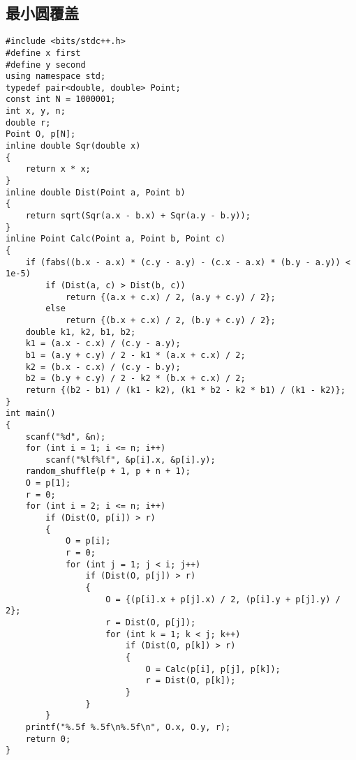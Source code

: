 \documentclass[a4paper]{article}
\begin{document}
\subsection{最小圆覆盖}
\begin{lstlisting}
#include <bits/stdc++.h>
#define x first
#define y second
using namespace std;
typedef pair<double, double> Point;
const int N = 1000001;
int x, y, n;
double r;
Point O, p[N];
inline double Sqr(double x)
{
    return x * x;
}
inline double Dist(Point a, Point b)
{
    return sqrt(Sqr(a.x - b.x) + Sqr(a.y - b.y));
}
inline Point Calc(Point a, Point b, Point c)
{
    if (fabs((b.x - a.x) * (c.y - a.y) - (c.x - a.x) * (b.y - a.y)) < 1e-5)
        if (Dist(a, c) > Dist(b, c))
            return {(a.x + c.x) / 2, (a.y + c.y) / 2};
        else
            return {(b.x + c.x) / 2, (b.y + c.y) / 2};
    double k1, k2, b1, b2;
    k1 = (a.x - c.x) / (c.y - a.y);
    b1 = (a.y + c.y) / 2 - k1 * (a.x + c.x) / 2;
    k2 = (b.x - c.x) / (c.y - b.y);
    b2 = (b.y + c.y) / 2 - k2 * (b.x + c.x) / 2;
    return {(b2 - b1) / (k1 - k2), (k1 * b2 - k2 * b1) / (k1 - k2)};
}
int main()
{
    scanf("%d", &n);
    for (int i = 1; i <= n; i++)
        scanf("%lf%lf", &p[i].x, &p[i].y);
    random_shuffle(p + 1, p + n + 1);
    O = p[1];
    r = 0;
    for (int i = 2; i <= n; i++)
        if (Dist(O, p[i]) > r)
        {
            O = p[i];
            r = 0;
            for (int j = 1; j < i; j++)
                if (Dist(O, p[j]) > r)
                {
                    O = {(p[i].x + p[j].x) / 2, (p[i].y + p[j].y) / 2};
                    r = Dist(O, p[j]);
                    for (int k = 1; k < j; k++)
                        if (Dist(O, p[k]) > r)
                        {
                            O = Calc(p[i], p[j], p[k]);
                            r = Dist(O, p[k]);
                        }
                }
        }
    printf("%.5f %.5f\n%.5f\n", O.x, O.y, r);
    return 0;
}
\end{lstlisting}
\end{document}
